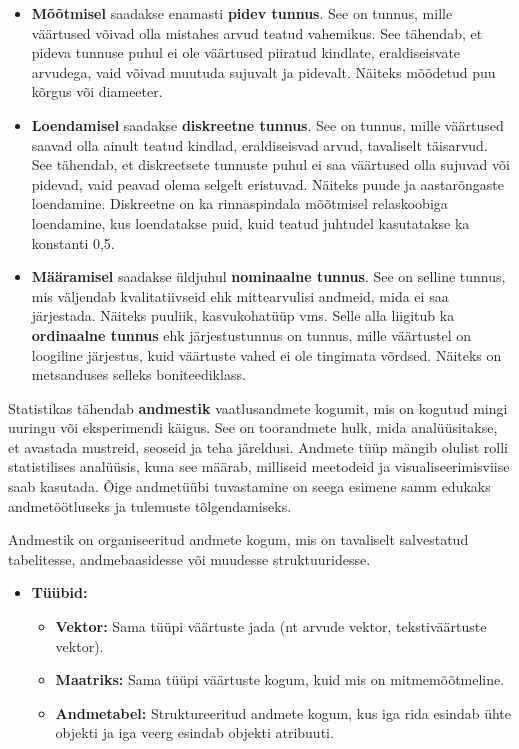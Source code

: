 \documentclass[
]{book}
\providecommand{\tightlist}{%
  \setlength{\itemsep}{0pt}\setlength{\parskip}{0pt}}
\theoremstyle{definition}
\theoremstyle{definition}
\theoremstyle{definition}
\theoremstyle{definition}
\theoremstyle{remark}
\begin{document}
\begin{itemize}
\tightlist
\item
  \textbf{Mõõtmisel} saadakse enamasti \textbf{pidev tunnus}. See on tunnus, mille väärtused võivad olla mistahes arvud teatud vahemikus. See tähendab, et pideva tunnuse puhul ei ole väärtused piiratud kindlate, eraldiseisvate arvudega, vaid võivad muutuda sujuvalt ja pidevalt. Näiteks mõõdetud puu kõrgus või diameeter.
\item
  \textbf{Loendamisel} saadakse \textbf{diskreetne tunnus}. See on tunnus, mille väärtused saavad olla ainult teatud kindlad, eraldiseisvad arvud, tavaliselt täisarvud. See tähendab, et diskreetsete tunnuste puhul ei saa väärtused olla sujuvad või pidevad, vaid peavad olema selgelt eristuvad. Näiteks puude ja aastarõngaste loendamine. Diskreetne on ka rinnaspindala mõõtmisel relaskoobiga loendamine, kus loendatakse puid, kuid teatud juhtudel kasutatakse ka konstanti 0,5.
\item
  \textbf{Määramisel} saadakse üldjuhul \textbf{nominaalne tunnus}. See on selline tunnus, mis väljendab kvalitatiivseid ehk mittearvulisi andmeid, mida ei saa järjestada. Näiteks puuliik, kasvukohatüüp vms. Selle alla liigitub ka \textbf{ordinaalne tunnus} ehk järjestustunnus on tunnus, mille väärtustel on loogiline järjestus, kuid väärtuste vahed ei ole tingimata võrdsed. Näiteks on metsanduses selleks boniteediklass.
\end{itemize}

Statistikas tähendab \textbf{andmestik} vaatlusandmete kogumit, mis on kogutud mingi uuringu või eksperimendi käigus. See on toorandmete hulk, mida analüüsitakse, et avastada mustreid, seoseid ja teha järeldusi. Andmete tüüp mängib olulist rolli statistilises analüüsis, kuna see määrab, milliseid meetodeid ja visualiseerimisviise saab kasutada. Õige andmetüübi tuvastamine on seega esimene samm edukaks andmetöötluseks ja tulemuste tõlgendamiseks.

Andmestik on organiseeritud andmete kogum, mis on tavaliselt salvestatud tabelitesse, andmebaasidesse või muudesse struktuuridesse.

\begin{itemize}
\tightlist
\item
  \textbf{Tüübid:}

  \begin{itemize}
  \tightlist
  \item
    \textbf{Vektor:} Sama tüüpi väärtuste jada (nt arvude vektor, tekstiväärtuste vektor).
  \item
    \textbf{Maatriks:} Sama tüüpi väärtuste kogum, kuid mis on mitmemõõtmeline.
  \item
    \textbf{Andmetabel:} Struktureeritud andmete kogum, kus iga rida esindab ühte objekti ja iga veerg esindab objekti atribuuti.
  \end{itemize}
\end{itemize}
\end{document}
